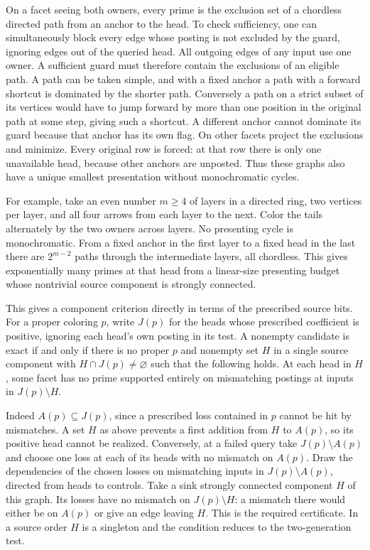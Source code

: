 On a facet seeing both owners, every prime is the
exclusion set of a chordless directed path from an
anchor to the head. To check sufficiency, one can
simultaneously block every edge whose posting is not
excluded by the guard, ignoring edges out of the
queried head. All outgoing edges of any input use
one owner. A sufficient guard must therefore
contain the exclusions of an eligible path. A path
can be taken simple, and with a fixed anchor a path
with a forward shortcut is dominated by the shorter
path. Conversely a path on a strict subset of its
vertices would have to jump forward by more than one
position in the original path at some step, giving
such a shortcut. A different anchor cannot dominate
its guard because that anchor has its own flag.
On other facets project the exclusions and minimize.
Every original row is forced: at that row there is
only one unavailable head, because other anchors are
unposted. Thus these graphs also have a unique
smallest presentation without monochromatic cycles.

For example, take an even number $m\ge4$ of layers
in a directed ring, two vertices per layer, and all
four arrows from each layer to the next. Color the
tails alternately by the two owners across layers.
No presenting cycle is monochromatic. From a fixed
anchor in the first layer to a fixed head in the
last there are $2^{m-2}$ paths through the intermediate
layers, all chordless. This gives exponentially many
primes at that head from a linear-size presenting
budget whose nontrivial source component is strongly
connected.

This gives a component criterion directly in terms of
the prescribed source bits. For a proper coloring $p$,
write $J(p)$ for the heads whose prescribed coefficient
is positive, ignoring each head's own posting in its
test. A nonempty candidate is exact if and only if there
is no proper $p$ and nonempty set $H$ in a single source
component with $H\cap J(p)\ne\varnothing$ such that the
following holds. At each head in $H$, some facet has no
prime supported entirely on mismatching postings at
inputs in $J(p)\setminus H$.

Indeed $A(p)\subseteq J(p)$, since a prescribed loss
contained in $p$ cannot be hit by mismatches. A set $H$
as above prevents a first addition from $H$ to $A(p)$,
so its positive head cannot be realized. Conversely,
at a failed query take $J(p)\setminus A(p)$ and choose
one loss at each of its heads with no mismatch on $A(p)$.
Draw the dependencies of the chosen losses on mismatching
inputs in $J(p)\setminus A(p)$, directed from heads to
controls. Take a sink strongly connected component $H$
of this graph. Its losses have no mismatch on
$J(p)\setminus H$: a mismatch there would either be
on $A(p)$ or give an edge leaving $H$. This is the
required certificate. In a source order $H$ is a
singleton and the condition reduces to the two-generation
test.

